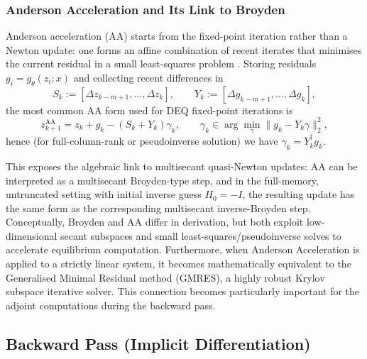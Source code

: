 \subsubsection*{Anderson Acceleration and Its Link to Broyden}
Anderson acceleration (AA) starts from the fixed-point iteration rather than a Newton update: one forms an affine combination of recent iterates that minimises the current residual in a small least-squares problem \cite{walker2011anderson}. Storing residuals $g_i=g_\theta(z_i;x)$ and collecting recent differences in
\begin{equation*}
    S_k := [\Delta z_{k-m+1},\ldots,\Delta z_k],
    \qquad
    Y_k := [\Delta g_{k-m+1},\ldots,\Delta g_k],
\end{equation*}
the most common AA form used for DEQ fixed-point iterations is
\begin{equation*}
    z_{k+1}^{\mathrm{AA}}
    = z_k + g_k - (S_k+Y_k)\gamma_k,
    \qquad
    \gamma_k \in \arg\min_{\gamma}\|g_k-Y_k\gamma\|_2^2,
\end{equation*}
hence (for full-column-rank or pseudoinverse solution) we have $\gamma_k = Y_k^\dagger g_k$.

This exposes the algebraic link to multisecant quasi-Newton updates: AA can be interpreted as a multisecant Broyden-type step, and in the full-memory, untruncated setting with initial inverse guess $H_0=-I$, the resulting update has the same form as the corresponding multisecant inverse-Broyden step. Conceptually, Broyden and AA differ in derivation, but both exploit low-dimensional secant subspaces and small least-squares/pseudoinverse solves to accelerate equilibrium computation. Furthermore, when Anderson Acceleration is applied to a strictly linear system, it becomes mathematically equivalent to the Generalised Minimal Residual method (GMRES), a highly robust Krylov subspace iterative solver. This connection becomes particularly important for the adjoint computations during the backward pass.

\subsection{Backward Pass (Implicit Differentiation)}

